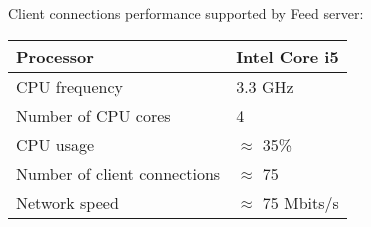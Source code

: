 Client connections performance supported by Feed server:
\newline

\begin{tabular}{|l|l|}
  \hline
  Processor & Intel Core i5\\   \hline
  CPU frequency & 3.3 GHz \\  \hline
  Number of CPU cores &  4 \\  \hline
  CPU usage &  $\approx$ 35\% \\  \hline
  Number of client connections & $\approx$ 75 \\  \hline
  Network speed & $\approx$  75 Mbits/s  \\  \hline
\end{tabular}

